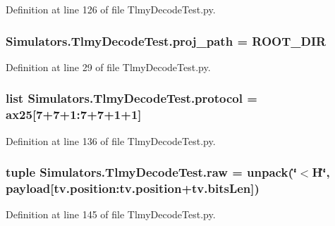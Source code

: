 Definition at line 126 of file Tlmy\+Decode\+Test.\+py.

\hypertarget{namespace_simulators_1_1_tlmy_decode_test_a4313ff4769b13f6edb1bcf7104f71022}{}
\subsubsection[{proj\+\_\+path}]{\setlength{\rightskip}{0pt plus 5cm}Simulators.\+Tlmy\+Decode\+Test.\+proj\+\_\+path = {\bf R\+O\+O\+T\+\_\+\+D\+I\+R}}\label{namespace_simulators_1_1_tlmy_decode_test_a4313ff4769b13f6edb1bcf7104f71022}


Definition at line 29 of file Tlmy\+Decode\+Test.\+py.

\hypertarget{namespace_simulators_1_1_tlmy_decode_test_aac705aff6da570227b368a174ac4b94e}{}
\subsubsection[{protocol}]{\setlength{\rightskip}{0pt plus 5cm}list Simulators.\+Tlmy\+Decode\+Test.\+protocol = {\bf ax25}\mbox{[}7+7+1\+:7+7+1+1\mbox{]}}\label{namespace_simulators_1_1_tlmy_decode_test_aac705aff6da570227b368a174ac4b94e}


Definition at line 136 of file Tlmy\+Decode\+Test.\+py.

\hypertarget{namespace_simulators_1_1_tlmy_decode_test_a760536b1eb2885f9620232c9aefbac41}{}
\subsubsection[{raw}]{\setlength{\rightskip}{0pt plus 5cm}tuple Simulators.\+Tlmy\+Decode\+Test.\+raw = unpack(\char`\"{}$<$H\char`\"{}, payload\mbox{[}tv.\+position\+:tv.\+position+tv.\+bits\+Len\mbox{]})}\label{namespace_simulators_1_1_tlmy_decode_test_a760536b1eb2885f9620232c9aefbac41}


Definition at line 145 of file Tlmy\+Decode\+Test.\+py.

